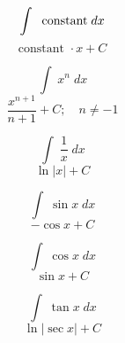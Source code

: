 \documentclass[avery5371,grid]{flashcards}
\begin{document}
\begin{flashcard}{\large \vspace*{\fill} \[ \int\; \text{ \normalfont constant} \;dx  \] \vspace*{\fill}   }{\large \vspace*{\fill} \[ \text{constant } \cdot x + C  \] \vspace*{\fill}   }\end{flashcard}

\begin{flashcard}{\large \vspace*{\fill} \[ \int\; x^n \;dx  \] \vspace*{\fill}   }{\large \vspace*{\fill} \[ \dfrac{x^{n+1}}{n+1} + C ; \quad n \neq -1  \] \vspace*{\fill}   }\end{flashcard}

\begin{flashcard}{\large \vspace*{\fill} \[ \int\; \dfrac{1}{x} \;dx \] \vspace*{\fill}   }{\large \vspace*{\fill} \[ \ln|x| + C  \] \vspace*{\fill}   }\end{flashcard}

\begin{flashcard}{\large \vspace*{\fill} \[ \int\; \sin x \;dx  \] \vspace*{\fill}   }{\large \vspace*{\fill} \[ -\cos x + C  \] \vspace*{\fill}   }\end{flashcard}

\begin{flashcard}{\large \vspace*{\fill} \[ \int\; \cos x \;dx \] \vspace*{\fill}   }{\large \vspace*{\fill} \[ \sin x + C  \] \vspace*{\fill}   }\end{flashcard}

\begin{flashcard}{\large \vspace*{\fill} \[ \int\; \tan x \;dx \] \vspace*{\fill}   }{\large \vspace*{\fill} \[ \ln|\sec x| + C   \] \vspace*{\fill}   }\end{flashcard}
\end{document}
